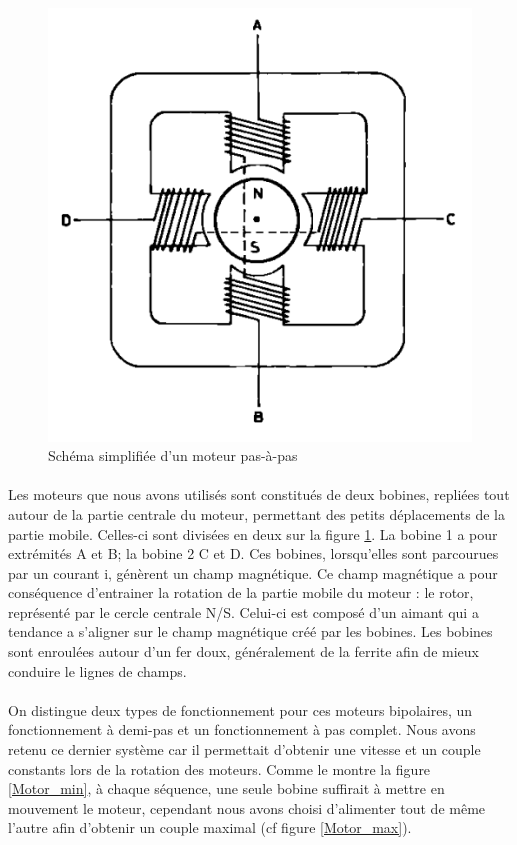 \documentclass[12pt,a4paper]{report}
\begin{document}
\begin{figure}[!h]
 \center
 \includegraphics[scale=0.38]{../pictures/schema_stepper_motor.png}
 \caption{Schéma simplifiée d'un moteur pas-à-pas\protect\footnotemark}
 \label{schema_stepper}
\end{figure}

\paragraph{} Les moteurs que nous avons utilisés sont constitués de deux bobines, repliées tout autour de la partie centrale du moteur, permettant des petits déplacements de la partie mobile. Celles-ci sont divisées en deux sur la figure \ref{schema_stepper}. La bobine 1 a pour extrémités A et B; la bobine 2 C et D. Ces bobines, lorsqu'elles sont parcourues par un courant i, génèrent un champ magnétique. Ce champ magnétique a pour conséquence d'entrainer la rotation de la partie mobile du moteur : le rotor, représenté par le cercle centrale N/S. Celui-ci est composé d'un aimant qui a tendance a s'aligner sur le champ magnétique créé par les bobines. 
Les bobines sont enroulées autour d'un fer doux, généralement de la ferrite afin de mieux conduire le lignes de champs.

\paragraph{} On distingue deux types de fonctionnement pour ces moteurs bipolaires, un fonctionnement à demi-pas et un fonctionnement à pas complet. Nous avons retenu ce dernier système car il permettait d'obtenir une vitesse et un couple constants lors de la rotation des moteurs. 
Comme le montre la figure \ref{Motor_min}, à chaque séquence, une seule bobine suffirait à mettre en mouvement le moteur, cependant nous avons choisi d'alimenter tout de même l'autre afin d'obtenir un couple maximal (cf figure \ref{Motor_max}). 
\end{document}
